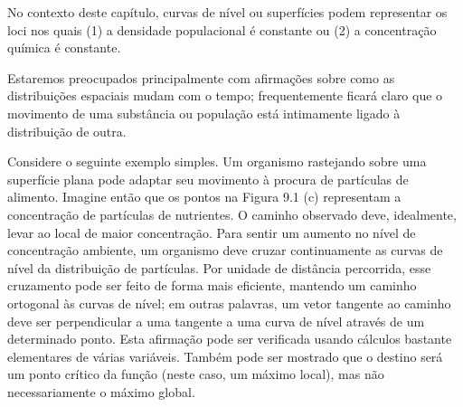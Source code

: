 No contexto deste capítulo, curvas de nível ou superfícies podem representar os loci nos quais (1) a densidade populacional é constante ou (2) a concentração química é constante.

Estaremos preocupados principalmente com afirmações sobre como as distribuições espaciais mudam com o tempo; frequentemente ficará claro que o movimento de uma substância ou população está intimamente ligado à distribuição de outra.

Considere o seguinte exemplo simples. Um organismo rastejando sobre uma superfície plana pode adaptar seu movimento à procura de partículas de alimento. Imagine então que os pontos na Figura 9.1 (c) representam a concentração de partículas de nutrientes. O caminho observado deve, idealmente, levar ao local de maior concentração. Para sentir um aumento no nível de concentração ambiente, um organismo deve cruzar continuamente as curvas de nível da distribuição de partículas. Por unidade de distância percorrida, esse cruzamento pode ser feito de forma mais eficiente, mantendo um caminho ortogonal às curvas de nível; em outras palavras, um vetor tangente ao caminho deve ser perpendicular a uma tangente a uma curva de nível através de um determinado ponto. Esta afirmação pode ser verificada usando cálculos bastante elementares de várias variáveis. Também pode ser mostrado que o destino será um ponto crítico da função (neste caso, um máximo local), mas não necessariamente o máximo global.


